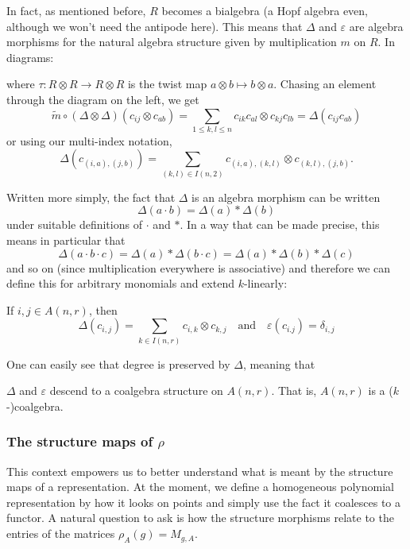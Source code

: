 \documentclass[12pt]{article}
\begin{document}
In fact, as mentioned before, $R$ becomes a bialgebra (a Hopf algebra even, although we won't need the antipode here). This means that 
$\Delta$ and $\varepsilon$ are algebra morphisms for the natural algebra structure given by multiplication $m$ on $R$. In diagrams:
\begin{center}
	\quad{}
\end{center}
where $\tau:R\otimes R\to R\otimes R$ is the twist map $a\otimes b\mapsto b\otimes a$. 
Chasing an element through the diagram on the left, we get
\[\tilde m\circ (\Delta\otimes \Delta)(c_{ij}\otimes c_{ab})=\sum_{1\le k,l\le n}c_{ik}c_{al}\otimes c_{kj}c_{lb}=\Delta(c_{ij}{c_{ab}})\]
or using our multi-index notation,
\[\Delta(c_{(i,a),(j,b)})=\sum_{(k,l)\in I(n,2)}c_{(i,a),(k,l)}\otimes c_{(k,l),(j,b)}.\]

Written more simply, the fact that $\Delta$ is an algebra morphism can be written 
\[\Delta(a\cdot b)=\Delta(a)\ast\Delta(b)\]
under suitable definitions of $\cdot$ and $\ast$. In a way that can be made precise, this means in particular that 
\[\Delta(a\cdot b\cdot c)=\Delta(a)\ast\Delta(b\cdot c)=\Delta(a)\ast\Delta(b)\ast\Delta(c)\]
and so on (since multiplication everywhere is associative) and therefore we can define this for arbitrary monomials and extend $k$-linearly: 
\begin{prop}
	If $i,j\in A(n,r)$, then 
	\[\Delta(c_{i,j})=\sum_{k\in I(n,r)}c_{i,k}\otimes c_{k,j}\quad\text{and}\quad \varepsilon(c_{i.j})=\delta_{i,j}\]
\end{prop}
One can easily see that degree is preserved by $\Delta$, meaning that 
\begin{prop}
	$\Delta$ and $\varepsilon$ descend to a coalgebra structure on $A(n,r)$. That is, $A(n,r)$ is a ($k$-)coalgebra.
\end{prop}

\subsubsection{The structure maps of \texorpdfstring{$\rho$}{rho}}
This context empowers us to better understand what is meant by the structure maps of a representation. At the moment, we 
define a homogeneous polynomial representation by how it looks on points and simply use the fact it coalesces to a functor. 
A natural question to ask is how the structure morphisms relate to the entries of the matrices $\rho_A(g)=M_{g,A}$.
\end{document}
